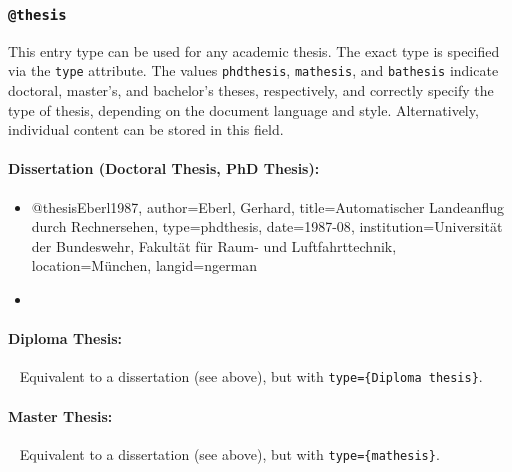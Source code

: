 
\subsubsection{\texttt{\bfseries @thesis}}
\label{sec:@thesis}

This entry type can be used for any academic thesis. The exact type is specified via the
\texttt{type} attribute. The values \texttt{phdthesis}, \texttt{mathesis}, and
\texttt{bathesis} indicate doctoral, master's, and bachelor's theses,
respectively, and correctly specify the type of thesis, depending on the
document language and style. Alternatively, individual content can be stored in
this field.

\paragraph{Dissertation (Doctoral Thesis, PhD Thesis):}
%
\begin{itemize}
\item[]
\begin{GenericCode}[numbers=none]
@thesis{Eberl1987,
  author={Eberl, Gerhard},
  title={Automatischer Landeanflug durch Rechnersehen},
  type={phdthesis},
  date={1987-08},
  institution={Universität der Bundeswehr, Fakultät für Raum- und Luftfahrttechnik},
  location={München},
  langid={ngerman}
}
\end{GenericCode}
\item[\cite{Eberl1987}] 
\end{itemize}

\paragraph{Diploma Thesis:} ~ \newline
Equivalent to a dissertation (see above), but with
\texttt{type=\obnh\{Diploma thesis\}}.


\paragraph{Master Thesis:} ~ \newline
Equivalent to a dissertation (see above), but with \texttt{type=\{mathesis\}}.%

